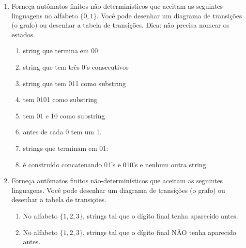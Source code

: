 \documentclass[11pt]{article}
\begin{document}
\begin{enumerate}

\item Forneça autômatos finitos não-determinísticos que aceitam as seguintes linguagens no alfabeto $\{0,1\}$. Você pode desenhar um diagrama de transições (o grafo) ou desenhar a tabela de transições. Dica: não precisa nomear os estados.

\begin{enumerate}

\item string que termina em 00

\item string que tem três 0's consecutivos

\item string que tem 011 como substring

\item tem 0101 como substring

\item tem 01 e 10 como substring

\item antes de cada 0 tem um 1.

\item strings que terminam em 01:



\item é construído concatenando 01's e 010's e nenhum outra string

\end{enumerate}

\item Forneça autômatos finitos não-determinísticos que aceitam as seguintes linguagens. Você pode desenhar um diagrama de transições (o grafo) ou desenhar a tabela de transições.
\begin{enumerate}

\item No alfabeto $\{1,2,3\}$, strings tal que o dígito final tenha aparecido antes.

\item No alfabeto $\{1,2,3\}$, strings tal que o dígito final NÃO tenha aparecido antes.

\end{enumerate}









\end{enumerate}
\end{document}
